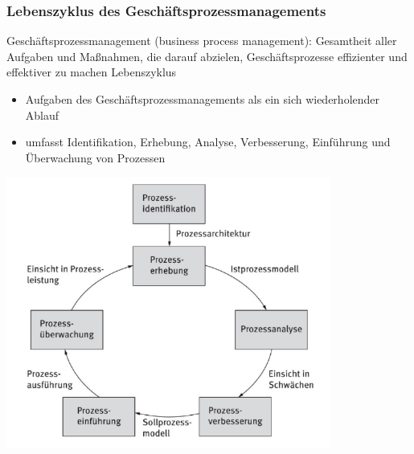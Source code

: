 \subsubsection{Lebenszyklus des Geschäftsprozessmanagements}
Geschäftsprozessmanagement (business process management): Gesamtheit aller Aufgaben und Maßnahmen, die darauf abzielen, Geschäftsprozesse effizienter und effektiver zu machen
Lebenszyklus
\begin{itemize}
  \item Aufgaben des Geschäftsprozessmanagements als ein sich wiederholender Ablauf
  \item umfasst Identifikation, Erhebung, Analyse, Verbesserung, Einführung und Überwachung von Prozessen
\end{itemize}
\includegraphics[width=0.8\textwidth]{assets/LebenszyklusGPM.PNG}
